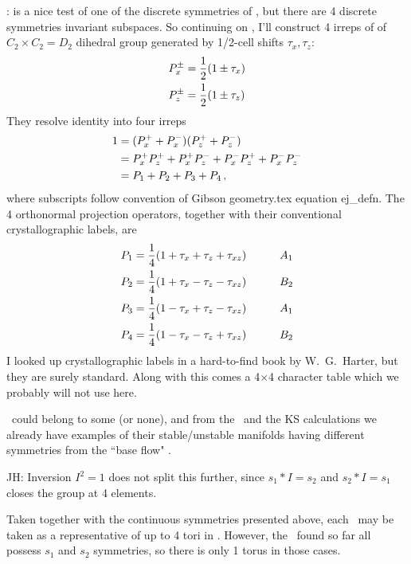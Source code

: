 :
is a nice test of one of the discrete symmetries of \pCf, but
there are 4 discrete symmetries invariant subspaces. So continuing on
, I'll construct 4 irreps of
of $C_2 \times C_2 = D_2$ dihedral group generated by 1/2-cell
shifts $\tau_x, \tau_z$:
\begin{align}
P_x^\pm &= \frac{1}{2}(1 \pm \tau_x)
    \nonumber \\ 
P_z^\pm &= \frac{1}{2}(1 \pm \tau_z)
\end{align}
They resolve identity into four irreps
\begin{align}
1 &= ({P}_x^+ + {P}_x^-) ({P}_z^+ + {P}_z^-)
    \nonumber \\ 
  &=  {P}_x^+ {P}_z^+
   +  {P}_x^+ {P}_z^-
   +  {P}_x^- {P}_z^+
   +  {P}_x^- {P}_z^-
    \nonumber \\ 
  &= {P}_1 + {P}_2 + {P}_3 + {P}_4
    \,,
\label{projOp:tau1}
\end{align}
where subscripts follow convention of Gibson geometry.tex
equation ej\_defn.
The 4 orthonormal projection operators, together with
their conventional crystallographic labels, are
\begin{align}
P_1 &= \frac{1}{4}({1} + \tau_x + \tau_z + \tau_{xz})
    & \qquad    A_1
    \nonumber \\ 
P_2 &= \frac{1}{4}({1} + \tau_x - \tau_z - \tau_{xz})
    & \qquad    B_2
    \nonumber \\ 
P_3 &= \frac{1}{4}({1} - \tau_x + \tau_z - \tau_{xz})
    & \qquad    A_1
    \nonumber \\ 
P_4 &= \frac{1}{4}({1} - \tau_x - \tau_z + \tau_{xz})
    & \qquad    B_2
\label{projOp:taus}
\end{align}
I looked up crystallographic labels in a hard-to-find book by
W.~G.~Harter, but they are surely standard. Along with this comes a
4$\times$4 character table which we probably will not use here.

\Eqva\ could belong to some (or none), and from the \ubranch\ and the KS
calculations
we already have examples of their stable/unstable manifolds
having different symmetries from the ``base flow" \eqv.

JH:{
Inversion  $I^2=1$ does not split this further,
since
$s_1*I = s_2$ and $s_2*I=s_1$ closes the group at 4 elements.
   }

Taken together with the continuous symmetries presented above, each \eqva\ may
be taken as a representative of up to 4 tori in \statesp . However, the \eqva\
found so far all possess $s_1$ and $s_2$ symmetries, so there is only
1 torus in those cases.

